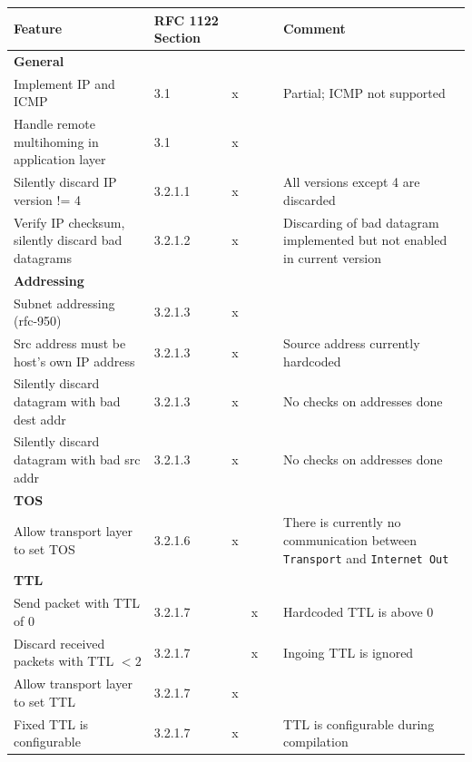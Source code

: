 	\begin{longtable}{ | p{} | p{} | p{} |  p{} | p{} | p{} |}
\hline
	\textbf{Feature} & \textbf{RFC 1122 Section} &
		\rotatebox{270}{\textbf{must}} &
		\rotatebox{270}{\textbf{must not}} &
		\rotatebox{270}{\textbf{Compliance }} &
        \textbf{Comment} \\ \hline
\textbf{General} \\ \hline
Implement IP and ICMP                            &3.1     &x& & \cellcolor{yellow!25} & Partial; ICMP not supported \\ \hline
Handle remote multihoming in application layer   &3.1     &x& & \cellcolor{red!25 }& \\ \hline
Silently discard IP version != 4                 &3.2.1.1 &x& & \cellcolor{green!25 }& All versions except 4 are discarded\\ \hline
Verify IP checksum, silently discard bad datagrams &3.2.1.2 &x& & \cellcolor{yellow!25} & Discarding of bad datagram implemented but not enabled in current version\\ \hline

\textbf{Addressing} \\ \hline
  Subnet addressing (rfc-950)                    &3.2.1.3 &x& & \cellcolor{red!25 }\\ \hline
  Src address must be host's own IP address      &3.2.1.3 &x& & \cellcolor{green!25 } & Source address currently hardcoded\\ \hline
  Silently discard datagram with bad dest addr   &3.2.1.3 &x& & \cellcolor{red!25 }& No checks on addresses done\\ \hline
  Silently discard datagram with bad src addr    &3.2.1.3 &x& & \cellcolor{red!25 } & No checks on addresses done\\ \hline

\textbf{TOS} \\ \hline
Allow transport layer to set TOS              &3.2.1.6 &x& & \cellcolor{red!25 }& There is currently no communication between \texttt{Transport} and \texttt{Internet Out}\\ \hline

\textbf{TTL} \\ \hline
  Send packet with TTL of 0                      &3.2.1.7 & &x& \cellcolor{green!25 }& Hardcoded TTL is above 0\\ \hline
  Discard received packets with TTL $ < 2$          &3.2.1.7 & &x& \cellcolor{green!25 }& Ingoing TTL is ignored\\ \hline
  Allow transport layer to set TTL               &3.2.1.7 &x& & \cellcolor{red!25 }&\\ \hline
  Fixed TTL is configurable                      &3.2.1.7 &x& & \cellcolor{green!25}& TTL is configurable during compilation\\ \hline


\end{longtable}
